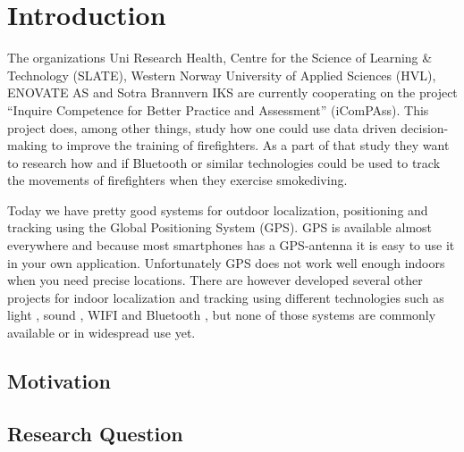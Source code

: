 \documentclass[../Main/thesis.tex]{subfiles}
\begin{document}
\chapter{Introduction}
\label{ch:introduction}

The organizations Uni Research Health, Centre for the Science of Learning \& Technology (SLATE), Western Norway University of Applied Sciences (HVL), ENOVATE AS and Sotra Brannvern IKS are currently cooperating on the project ``Inquire Competence for Better Practice and Assessment'' (iComPAss).
This project does, among other things, study how one could use data driven decision-making to improve the training of firefighters.
As a part of that study they want to research how and if Bluetooth or similar technologies could be used to track the movements of firefighters when they exercise smokediving.
 
Today we have pretty good systems for outdoor localization, positioning and tracking using the Global Positioning System (GPS). 
GPS is available almost everywhere and because most smartphones has a GPS-antenna it is easy to use it in your own application. 
Unfortunately GPS does not work well enough indoors when you need precise locations.
There are however developed several other projects for indoor localization and tracking using different technologies such as light \citep{xiaohan2010improved}, sound \citep{schweinzer2010ultrasonic}, WIFI  \citep{chang2010robust} and Bluetooth , but none of those systems are commonly available or in widespread use yet.


\section{Motivation}



\section{Research Question}



\onlyinsubfile{}
\onlyinsubfile{}
\end{document}
